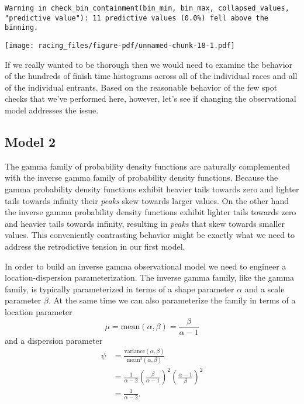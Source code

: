 \documentclass[
  letterpaper,
  DIV=11,
  numbers=noendperiod]{scrartcl}
\begin{document}
\begin{verbatim}
Warning in check_bin_containment(bin_min, bin_max, collapsed_values,
"predictive value"): 11 predictive values (0.0%) fell above the binning.
\end{verbatim}

\texttt{[image: racing\_files/figure-pdf/unnamed-chunk-18-1.pdf]}

If we really wanted to be thorough then we would need to examine the
behavior of the hundreds of finish time histograms across all of the
individual races and all of the individual entrants. Based on the
reasonable behavior of the few spot checks that we've performed here,
however, let's see if changing the observational model addresses the
issue.

\subsection{Model 2}\label{model-2}

The gamma family of probability density functions are naturally
complemented with the inverse gamma family of probability density
functions. Because the gamma probability density functions exhibit
heavier tails towards zero and lighter tails towards infinity their
\emph{peaks} skew towards larger values. On the other hand the inverse
gamma probability density functions exhibit lighter tails towards zero
and heavier tails towards infinity, resulting in \emph{peaks} that skew
towards smaller values. This conveniently contrasting behavior might be
exactly what we need to address the retrodictive tension in our first
model.

In order to build an inverse gamma observational model we need to
engineer a location-dispersion parameterization. The inverse gamma
family, like the gamma family, is typically parameterized in terms of a
shape parameter \(\alpha\) and a scale parameter \(\beta\). At the same
time we can also parameterize the family in terms of a location
parameter \[
\mu = \text{mean}(\alpha, \beta) = \frac{\beta}{\alpha - 1}
\] and a dispersion parameter \begin{align*}
\psi
&=
\frac{ \text{variance}(\alpha, \beta) }{ \text{mean}^{2}(\alpha, \beta) }
\\
&=
\frac{1}{\alpha - 2} \left( \frac{ \beta }{ \alpha - 1} \right)^{2}
\left( \frac{ \alpha - 1 }{ \beta } \right)^{2}
\\
&=
\frac{1}{\alpha - 2}.
\end{align*}
\end{document}
